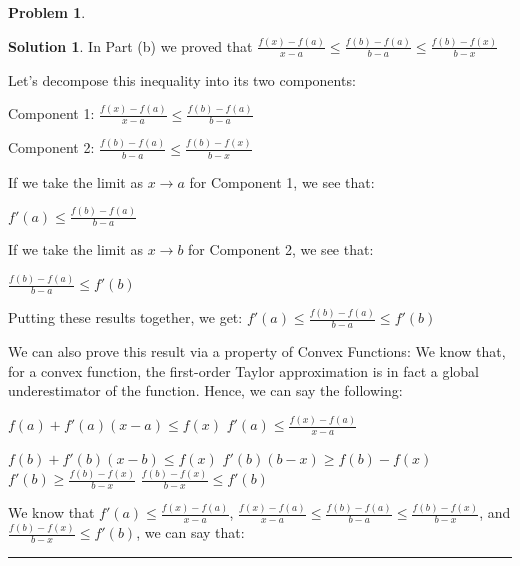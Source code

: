 \documentclass{article}
\theoremstyle{definition}
\newtheorem{problem}{Problem}
\def\fline{\rule{0.75\linewidth}{0.5pt}}
\newcommand{\finishline}{\begin{center}\fline\end{center}}
\newtheorem*{solution*}{Solution}
\newenvironment{solution}{\begin{solution*}}{{\finishline} \end{solution*}}
\begin{document}
\begin{problem}
\begin{enumerate}
\begin{solution}
                In Part (b) we proved that $\frac{f(x) - f(a)}{x - a}  \leq \frac{f(b) - f(a)}{b - a} \leq \frac{f(b) - f(x)}{b - x}$ \newline 

                Let's decompose this inequality into its two components: \newline 

                Component 1: $\frac{f(x) - f(a)}{x - a}  \leq \frac{f(b) - f(a)}{b - a}$ 

                Component 2: $\frac{f(b) - f(a)}{b - a} \leq \frac{f(b) - f(x)}{b - x}$

                If we take the limit as $x \rightarrow a$ for Component 1, we see that: \newline 

                $f'(a) \leq \frac{f(b) - f(a)}{b - a}$ \newline 

                If we take the limit as $x \rightarrow b$ for Component 2, we see that: \newline 

                $\frac{f(b) - f(a)}{b - a} \leq f'(b)$ \newline 

                Putting these results together, we get: $f'(a) \leq  \frac{f(b) - f(a)}{b - a} \leq f'(b)$

                We can also prove this result via a property of Convex Functions: \newline 
                We know that, for a convex function, the first-order Taylor approximation is in fact a global underestimator of the function. Hence, we can say the following: \newline 

                    $f(a) + f'(a) (x - a) \leq f(x)$ \newline 
                    $f'(a) \leq \frac{f(x) - f(a)}{x - a}$ \newline 

                    $f(b) + f'(b) (x - b) \leq f(x)$ \newline 
                    $f'(b) (b - x) \geq f(b) - f(x)$ \newline 
                    $f'(b) \geq \frac{f(b) - f(x)}{b - x}$ \newline
                    $\frac{f(b) - f(x)}{b - x} \leq f'(b)$ \newline


                    We know that $f'(a) \leq \frac{f(x) - f(a)}{x - a}$, $\frac{f(x) - f(a)}{x - a}  \leq \frac{f(b) - f(a)}{b - a} \leq \frac{f(b) - f(x)}{b - x}$, and $\frac{f(b) - f(x)}{b - x} \leq f'(b)$, we can say that: \newline 


\end{solution}
\end{enumerate}
\end{problem}
\end{document}
